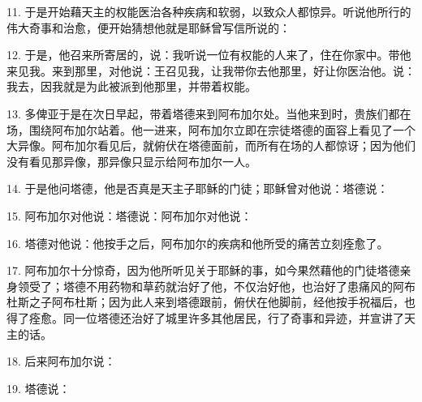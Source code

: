 11. 于是开始藉天主的权能医治各种疾病和软弱，以致众人都惊异。听说他所行的伟大奇事和治愈，便开始猜想他就是耶稣曾写信所说的：\par

12. 于是，他召来所寄居的，说：我听说一位有权能的人来了，住在你家中。带他来见我。来到那里，对他说：王召见我，让我带你去他那里，好让你医治他。说：我去，因我就是为此被派到他那里，并带着权能。\par

13. 多俾亚于是在次日早起，带着塔德来到阿布加尔处。当他来到时，贵族们都在场，围绕阿布加尔站着。他一进来，阿布加尔立即在宗徒塔德的面容上看见了一个大异像。阿布加尔看见后，就俯伏在塔德面前，而所有在场的人都惊讶；因为他们没有看见那异像，那异像只显示给阿布加尔一人。\par

14. 于是他问塔德，他是否真是天主子耶稣的门徒；耶稣曾对他说：塔德说：\par

15. 阿布加尔对他说：塔德说：阿布加尔对他说：\par

16. 塔德对他说：他按手之后，阿布加尔的疾病和他所受的痛苦立刻痊愈了。\par

17. 阿布加尔十分惊奇，因为他所听见关于耶稣的事，如今果然藉他的门徒塔德亲身领受了；塔德不用药物和草药就治好了他，不仅治好他，也治好了患痛风的阿布杜斯之子阿布杜斯；因为此人来到塔德跟前，俯伏在他脚前，经他按手祝福后，也得了痊愈。同一位塔德还治好了城里许多其他居民，行了奇事和异迹，并宣讲了天主的话。\par

18. 后来阿布加尔说：\par

19. 塔德说：\par

